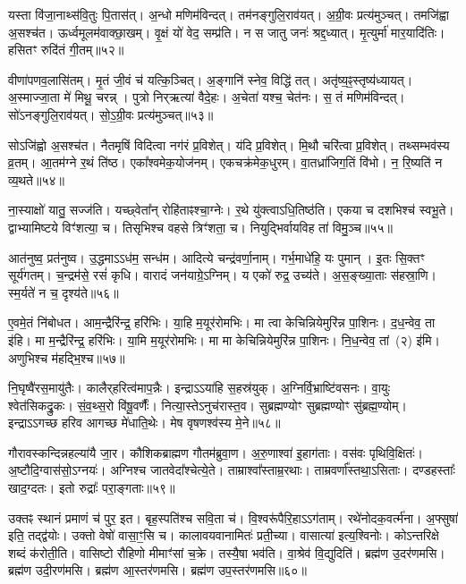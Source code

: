 यस्ता वि॑जा॒नाथ्स॑वि॒तुः पि॒तास॑त्। अ॒न्धो मणिम॑विन्दत्। 
तम॑नङ्गुलि॒राव॑यत्। अ॒ग्री॒वः प्रत्य॑मुञ्चत्। 
तमजि॑ह्वा अ॒सश्च॑त। ऊर्ध्वमूलम॑वाक्छा॒खम्। 
वृ॒क्षं यो॑ वेद॒ सम्प्र॑ति। न स जातु जनः॑ श्रद्द॒ध्यात्। 
मृ॒त्युर्मा॑ मार॒यादि॑तिः। हसितꣳ रुदि॑तं गी॒तम्॥५२॥


वीणा॑पणव॒लासि॑तम्। मृ॒तं जी॒वं च॑ यत्कि॒ञ्चित्। 
अ॒ङ्गानि॑ स्नेव॒ विद्धि॑ तत्। अतृ॑ष्य॒ꣴ॒स्तृष्य॑ध्यायत्। 
अ॒स्माज्जा॒ता मे॑ मिथू॒ चरन्न्। पुत्रो निर्‌ऋत्या॑ वैदे॒हः। 
अ॒चेता॑ यश्च॒ चेत॑नः। स॒ तं मणिम॑विन्दत्। 
सो॑ऽनङ्गुलि॒राव॑यत्। सो॒ऽ॒ग्री॒वः प्रत्य॑मुञ्चत्॥५३॥


सोऽजि॑ह्वो अ॒सश्च॑त। नैतमृषिं विदित्वा नग॑रं प्र॒विशेत्। 
य॑दि प्र॒विशेत्। मि॒थौ चरि॑त्वा प्र॒विशेत्। 
तथ्सम्भव॑स्य व्र॒तम्। आ॒तम॑ग्ने र॒थं ति॑ष्ठ। 
एका᳚श्वमेक॒योज॑नम्। एकचक्र॑मेक॒धुरम्। 
वा॒तध्रा॑जिग॒तिं वि॑भो। न॒ रि॒ष्यति॑ न व्य॒थते॥५४॥


ना॒स्याक्षो॑ यातु॒ सज्ज॑ति। यच्छ्वेता᳚न्‌ रोहि॑ताꣴश्चा॒ग्नेः। 
र॒थे यु॑क्त्वाऽधि॒\-तिष्ठ॑ति। एकया च दशभिश्च॑ स्वभू॒ते। 
द्वाभ्यामिष्टये विꣳ॑शत्या॒ च। तिसृभिश्च वहसे त्रिꣳ॑शता॒ च। 
नियुद्भिर्वायविह ता॑ विमु॒ञ्च॥५५॥\anuvakamend


आत॑नुष्व॒ प्रत॑नुष्व। उ॒द्धमाऽऽध॑म॒ सन्ध॑म। 
आदित्ये चन्द्र॑वर्णा॒नाम्। गर्भ॒माधे॑हि॒ यः पुमान्। 
इ॒तः सि॒क्तꣳ सूर्य॑गतम्। च॒न्द्रम॑से॒ रसं॑ कृधि। 
वारादं जन॑याग्रे॒ऽग्निम्। य एको॑ रुद्र॒ उच्य॑ते। 
अ॒स॒ङ्ख्या॒ताः स॑हस्रा॒णि। स्म॒र्यते॑ न च॒ दृश्य॑ते॥५६॥


ए॒वमे॒तं नि॑बोधत। आम॒न्द्रैरि॑न्द्र॒ हरि॑भिः। 
या॒हि म॒यूर॑रोमभिः। मा त्वा केचिन्नियेमुरि॑न्न पा॒शिनः। 
द॒ध॒न्वेव॒ ता इ॑हि। मा म॒न्द्रैरि॑न्द्र॒ हरि॑भिः। 
या॒मि म॒यूर॑रोमभिः। मा मा केचिन्नियेमुरि॑न्न पा॒शिनः। 
नि॒ध॒न्वेव॒ \mbox{तां (२)} इ॑मि। अणुभिश्च म॑हद्भि॒श्च॥५७॥


नि॒घृष्वै॑रस॒मायु॑तैः। कालैर्‌हरित्व॑माप॒न्नैः। 
इन्द्राऽऽया॑हि स॒हस्र॑युक्। अ॒ग्निर्वि॒भ्राष्टि॑वसनः। 
वा॒युः श्वेत॑सिकद्रु॒कः। सं॒व॒थ्स॒रो वि॑षू॒वर्णैः᳚। 
नित्या॒स्तेऽनुच॑रास्त॒व। सुब्रह्मण्योꣳ सुब्रह्मण्योꣳ सु॑ब्रह्म॒ण्योम्। 
इन्द्राऽऽगच्छ हरिव आगच्छ मे॑धाति॒थेः। मेष वृषणश्व॑स्य मे॒ने॥५८॥


गौरावस्कन्दिन्नहल्या॑यै जा॒र। कौशिकब्राह्मण गौतम॑ब्रुवा॒ण। 
अ॒रु॒णाश्वा॑ इ॒हाग॑ताः। वस॑वः पृथिवि॒क्षितः॑। 
अ॒ष्टौदि॒ग्वास॑सो॒\-ऽग्नयः॑। अग्निश्च जातवेदा᳚श्चेत्ये॒ते। 
ताम्राश्वा᳚स्ताम्र॒रथाः। ताम्रवर्णा᳚स्तथा॒\-ऽसिताः। 
दण्डहस्ताः᳚ खाद॒ग्दतः। इतो रुद्राः᳚ परा॒ङ्गताः॥५९॥


उक्तꣴ स्थानं प्रमाणं च॑ पुर॒ इत। बृह॒स्पति॑श्च सवि॒ता च॑। 
वि॒श्वरू॑पैरि॒हाऽऽग॑ताम्। रथे॑नोदक॒वर्त्म॑ना। 
अ॒फ्सुषा॑ इति॒ तद्द्व॑योः। उक्तो वेषो॑ वासा॒ꣳ॒सि च। 
कालावयवानामितः॑ प्रती॒च्या। वासात्या॑ इत्य॒श्विनोः। 
कोऽन्तरिक्षे शब्दं क॑रोती॒ति। वासिष्टो रौहिणो मीमाꣳ॑सां च॒क्रे। 
तस्यै॒षा भव॑ति। वा॒श्रेव॑ वि॒द्युदिति॑। 
ब्रह्म॑ण उ॒दर॑णमसि। ब्रह्म॑ण उदी॒रण॑मसि। 
ब्रह्म॑ण आ॒स्तर॑णमसि। ब्रह्म॑ण उप॒स्तर॑णमसि॥६०॥\anuvakamend


